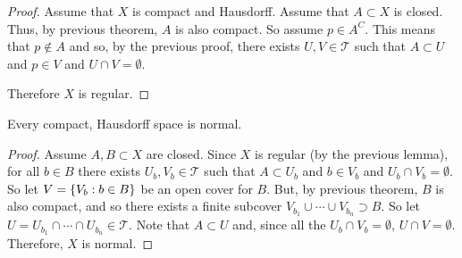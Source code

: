 \documentclass[letterpaper,12pt,fleqn]{article}
\newcommand{\T}{\mathscr{T}}
\begin{document}
\begin{proof}
  Assume that \(X\) is compact and Hausdorff.  Assume that \(A\subset X\) is closed.  Thus, by previous theorem,
  \(A\) is also compact.  So assume \(p\in A^C\).  This means that \(p\notin A\) and so, by the previous proof,
  there exists \(U,V\in\T\) such that \(A\subset U\) and \(p\in V\) and \(U\cap V=\emptyset\).

  Therefore \(X\) is regular.
\end{proof}

\begin{theorem}
  Every compact, Hausdorff space is normal.
\end{theorem}

\begin{proof}
  Assume \(A,B\subset X\) are closed.  Since \(X\) is regular (by the previous lemma), for all \(b\in B\) there
  exists \(U_b,V_b\in\T\) such that \(A\subset U_b\) and \(b\in V_b\) and \(U_b\cap V_b=\emptyset\).  So let
  \(V=\{V_b:b\in B\}\) be an open cover for \(B\).  But, by previous theorem, \(B\) is also compact, and so
  there exists a finite subcover \(V_{b_1}\cup\cdots\cup V_{b_n}\supset B\).  So let
  \(U=U_{b_1}\cap\cdots\cap U_{b_n}\in\T\).  Note that \(A\subset U\) and, since all the \(U_b\cap V_b=\emptyset\),
  \(U\cap V=\emptyset\).  Therefore, \(X\) is normal.
\end{proof}
\end{document}
